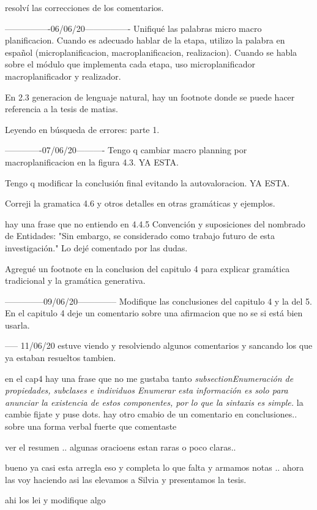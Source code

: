 resolví las correcciones de los comentarios.

----------------06/06/20----------------
Unifiqué las palabras micro macro planificacion. Cuando es adecuado hablar de la etapa, utilizo la palabra en español (microplanificacion, macroplanificacion, realizacion). Cuando se habla sobre el módulo que implementa cada etapa, uso microplanificador macroplanificador y realizador.

En 2.3 generacion de lenguaje natural, hay un footnote donde se puede hacer referencia a la tesis de matias.

Leyendo en búsqueda de errores: parte 1.


-------------07/06/20----------
Tengo q cambiar macro planning por macroplanificacion en la figura 4.3. YA ESTA.

Tengo q modificar la conclusión final evitando la autovaloracion. YA ESTA.

Correji la gramatica 4.6 y otros detalles en otras gramáticas y ejemplos.

hay una frase que no entiendo en 4.4.5 Convención y suposiciones del nombrado de Entidades: "Sin embargo, se considerado como trabajo futuro de esta investigación." Lo dejé comentado por las dudas. 

Agregué un footnote en la conclusion del capitulo 4 para explicar gramática tradicional y la gramática generativa.

--------------09/06/20--------------
Modifique las conclusiones del capitulo 4 y la del 5. En el capitulo 4 deje un comentario sobre una afirmacion que no se si está bien usarla. 

----- 11/06/20
estuve viendo y resolviendo algunos comentarios y sancando los que ya estaban resueltos tambien. 

en el cap4 hay una frase que no me gustaba tanto 
\textit{subsection{Enumeración de propiedades, subclases e individuos}
Enumerar esta información es solo para anunciar la existencia de estos componentes, por lo que la sintaxis es simple.
}
la cambie fijate y puse dots. 
hay otro cmabio de un comentario en conclusiones.. sobre una forma verbal fuerte que comentaste

ver el resumen .. algunas oracioens estan raras o poco claras..

bueno ya casi esta arregla eso y completa lo que falta y armamos notas .. ahora las voy haciendo asi las elevamos a Silvia y presentamos la tesis.


ahi los lei y modifique algo

